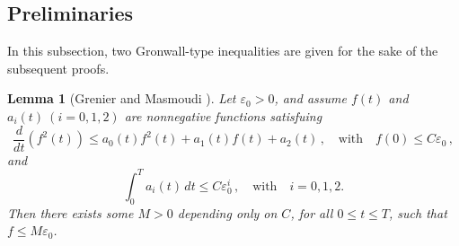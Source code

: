 \documentclass[pdflatex,sn-mathphys-num]{sn-jnl}%
\theoremstyle{thmstyleone}%
\theoremstyle{thmstyletwo}%
\theoremstyle{thmstylethree}%
\theoremstyle{thmstyletwo}
\newtheorem{lemma}{Lemma}
\begin{document}
 

 
 
 

%





















\subsection{Preliminaries}\label{subsec1.3}	In this subsection, two Gronwall-type inequalities are given for the sake of the subsequent proofs.
\begin{lemma}[Grenier and Masmoudi \cite{Grenier1997}]\label{f2}
	Let $\varepsilon_0>0$, and assume $f(t)$ and $a_i(t)~(i=0,1,2)$ are nonnegative functions satisfuing 
	\begin{equation*}
		\frac{d}{dt}(f^2(t))\leq
		a_0(t)f^2(t)+a_1(t)f(t)+a_2(t)\,,\quad\text{with}\quad
		f(0)\leq C\varepsilon_0\,,
	\end{equation*}
	and
	\begin{equation*}
		\int_{0}^{T}a_i(t)\,dt\leq C\varepsilon_0^i\,,\quad\text{with}\quad
		i=0,1,2.
	\end{equation*}
	Then there exists some $M>0$ depending only on $C$, for all $0\leq t\leq T$, such that $f\leq M\varepsilon_0$.
\end{lemma}
\end{document}
